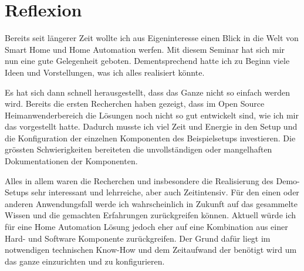 \section{Reflexion}
Bereits seit längerer Zeit wollte ich aus Eigeninteresse einen Blick in die Welt von Smart Home und Home Automation werfen. Mit diesem Seminar hat sich mir nun eine gute Gelegenheit geboten. Dementsprechend hatte ich zu Beginn viele Ideen und Vorstellungen, was ich alles realisiert könnte.

Es hat sich dann schnell herausgestellt, dass das Ganze nicht so einfach werden wird. Bereits die ersten Recherchen haben gezeigt, dass im Open Source Heimanwenderbereich die Lösungen noch nicht so gut entwickelt sind, wie ich mir das vorgestellt hatte. Dadurch musste ich viel Zeit und Energie in den Setup und die Konfiguration der einzelnen Komponenten des Beispielsetups investieren. Die grössten Schwierigkeiten bereiteten die unvollständigen oder mangelhaften Dokumentationen der Komponenten. 

Alles in allem waren die Recherchen und insbesondere die Realisierung des Demo-Setups sehr interessant und lehrreiche, aber auch Zeitintensiv. Für den einen oder anderen Anwendungsfall werde ich wahrscheinlich in Zukunft auf das gesammelte Wissen und die gemachten Erfahrungen zurückgreifen können. Aktuell würde ich für eine Home Automation Lösung jedoch eher auf eine Kombination aus einer Hard- und Software Komponente zurückgreifen. Der Grund dafür liegt im notwendigen technischen Know-How und dem Zeitaufwand der benötigt wird um das ganze einzurichten und zu konfigurieren.



